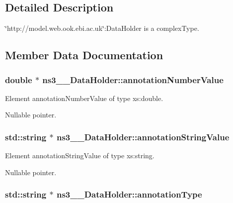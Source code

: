 \subsection{Detailed Description}
\char`\"{}http://model.web.ook.ebi.ac.uk\char`\"{}:DataHolder is a complexType. 

\subsection{Member Data Documentation}
\hypertarget{classns3____DataHolder_a7032400955e9a4998555a8b1af23cdaa}{
\subsubsection[{annotationNumberValue}]{\setlength{\rightskip}{0pt plus 5cm}double $\ast$ {\bf ns3\_\-\_\-DataHolder::annotationNumberValue}}}
\label{classns3____DataHolder_a7032400955e9a4998555a8b1af23cdaa}


Element annotationNumberValue of type xs:double. 

Nullable pointer. \hypertarget{classns3____DataHolder_a5217a69d2daed0559757d76e606c2124}{
\subsubsection[{annotationStringValue}]{\setlength{\rightskip}{0pt plus 5cm}std::string $\ast$ {\bf ns3\_\-\_\-DataHolder::annotationStringValue}}}
\label{classns3____DataHolder_a5217a69d2daed0559757d76e606c2124}


Element annotationStringValue of type xs:string. 

Nullable pointer. \hypertarget{classns3____DataHolder_a90aa873b08e6e6b22c6a5c379749653a}{
\subsubsection[{annotationType}]{\setlength{\rightskip}{0pt plus 5cm}std::string $\ast$ {\bf ns3\_\-\_\-DataHolder::annotationType}}}
\label{classns3____DataHolder_a90aa873b08e6e6b22c6a5c379749653a}


